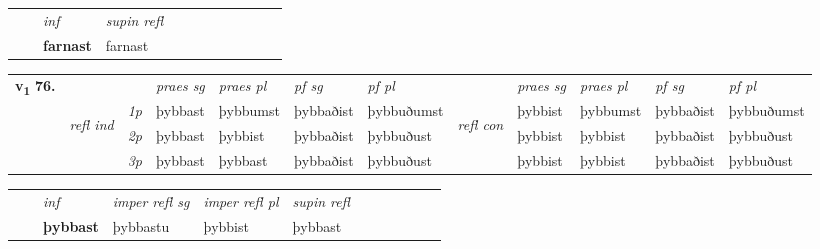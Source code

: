 \begin{tabular}{llllllllllll}
 & & \textit{inf}       & \textit{supin refl}      \\*
  & & \textbf{farnast}        & farnast  \\*
\cmidrule{1-12}
\end{tabular}



\begin{tabular}{llllllllllll} \toprule
\multirow{4}{*}{{{\textbf{v{\textsubscript{1}}} \Large{\textbf{76.}}}}}  & &   &  \textit{praes sg}  & \textit{praes pl}  &\textit{pf sg} & \textit{pf pl} &  &  \textit{praes sg}  & \textit{praes pl}  & \textit{pf sg} & \textit{pf pl } \\*
	\cmidrule{4-7} \cmidrule{9-12}
 &\multirow{3}{*}{\begin{turn}{90}\textit{refl ind}\end{turn}} & {\textit{1p}} & þybbast & þybbumst    & þybbaðist & þybbuðumst & \multirow{3}{*}{\begin{turn}{90}\textit{refl con}\end{turn}}  &þybbist & þybbumst & þybbaðist & þybbuðumst\\*
 &&  {\textit{2p}} &  þybbast  & þybbist   & þybbaðist & þybbuðust & &þybbist & þybbist & þybbaðist & þybbuðust \\*
& &  {\textit{3p}} & þybbast & þybbast   & þybbaðist & þybbuðust & & þybbist & þybbist& þybbaðist & þybbuðust  \\*
\cmidrule{4-7} \cmidrule{9-12}
\end{tabular}


\begin{tabular}{llllllllllll}
 & & \textit{inf}   & \textit{imper refl sg} & \textit{imper refl pl}   & \textit{supin refl}      \\*
  & & \textbf{þybbast}    & þybbastu & þybbist   & þybbast  \\*
\cmidrule{1-12}
\end{tabular}



